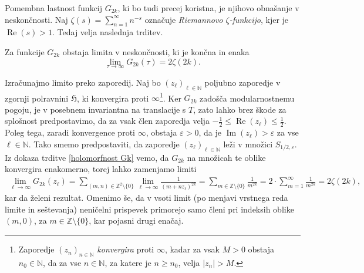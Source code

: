 \documentclass[mat1]{fmfdelo}
\numberwithin{equation}{section}
\newcommand{\R}{\mathbb R}
\newcommand{\N}{\mathbb N}
\newcommand{\Z}{\mathbb Z}
\newcommand{\HH}{\mathfrak{H}}
\newcommand{\abs}[1]{\left\lvert #1 \right\rvert}
\renewcommand\Re{\operatorname{Re}}%
\renewcommand\Im{\operatorname{Im}}%
\theoremstyle{definition}
\begin{document}
\begin{dokaz}
\end{dokaz}



Pomembna lastnost funkcij $G_{2k}$, ki bo tudi precej koristna, je njihovo obnašanje v neskončnosti. Naj $\zeta(s) = \sum_{n = 1}^\infty n^{-s}$ označuje \emph{Riemannovo $\zeta$-funkcijo}, kjer je $\Re(s) > 1$. Tedaj velja naslednja trditev.

\begin{trditev}
    \label{G2k v neskoncnosti}
    Za funkcije $G_{2k}$ obstaja limita v neskončnosti, ki je končna in enaka 
    \[
        \lim_{\tau \to \infty}G_{2k}(\tau) = 2\zeta(2k).  
    \]
\end{trditev}

\begin{dokaz}
    Izračunajmo limito preko zaporedij. Naj bo $(z_\ell)_{\ell\in\N}$ poljubno zaporedje v zgornji polravnini $\HH$, ki konvergira proti $\infty$\footnote{Zaporedje $(z_n)_{n \in \N}$ \emph{konvergira} proti $\infty$, kadar za vsak $M > 0$ obstaja $n_0 \in \N$, da za vse $n \in \N$, za katere je $n \geq n_0$, velja $\abs{z_n} > M$.}. Ker $G_{2k}$ zadošča modularnostnemu pogoju, je v posebnem invariantna na translacije s $T$, zato lahko brez škode za splošnost predpostavimo, da za vsak člen zaporedja velja $-\frac12 \leq \Re(z_\ell) \leq \frac12$. Poleg tega, zaradi konvergence proti $\infty$, obstaja $\varepsilon > 0$, da je $\Im(z_\ell) > \varepsilon$ za vse $\ell \in \N$.  Tako smemo predpostaviti, da zaporedje $(z_\ell)_{\ell \in\N}$ leži v množici $S_{1/2, \varepsilon}$. Iz dokaza trditve \ref{holomorfnost Gk} vemo, da $G_{2k}$ na množicah te oblike konvergira enakomerno, torej lahko zamenjamo limiti
    \begin{gather*}
        \lim_{\ell \to \infty}G_{2k}(z_\ell) = 
        \sum_{(m,n) \in \Z^2\setminus\{0\}} \lim_{\ell \to \infty} \frac{1}{(m + nz_\ell)^{2k}} = 
        \sum_{m \in \Z\setminus \{0\}} \frac{1}{m^{2k}} = 
        2 \cdot \sum_{m = 1}^\infty \frac{1}{m^{2k}} = 2\zeta(2k),
    \end{gather*}
    kar da želeni rezultat. Omenimo še, da v vsoti limit (po menjavi vrstnega reda limite in seštevanja) neničelni prispevek primorejo samo členi pri indeksih oblike $(m, 0)$, za $m \in \Z\setminus \{0\}$, kar pojasni drugi enačaj.
\end{dokaz}
\end{document}
